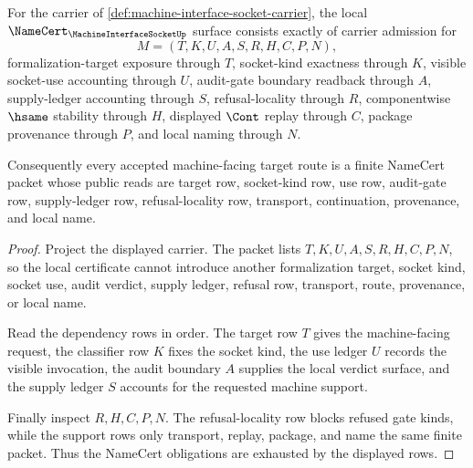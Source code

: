 \begin{theorem}
\label{thm:machine-interface-socket-namecert-obligations}
For the carrier of \autoref{def:machine-interface-socket-carrier}, the local $\NameCert_{\MachineInterfaceSocketUp}$ surface consists exactly of carrier admission for
$$
M=(T,K,U,A,S,R,H,C,P,N),
$$
formalization-target exposure through $T$, socket-kind exactness through $K$, visible socket-use accounting through $U$, audit-gate boundary readback through $A$, supply-ledger accounting through $S$, refusal-locality through $R$, componentwise $\hsame$ stability through $H$, displayed $\Cont$ replay through $C$, package provenance through $P$, and local naming through $N$.

Consequently every accepted machine-facing target route is a finite NameCert packet whose public reads are target row, socket-kind row, use row, audit-gate row, supply-ledger row, refusal-locality row, transport, continuation, provenance, and local name.
\end{theorem}
\begin{proof}
Project the displayed carrier. The packet lists $T,K,U,A,S,R,H,C,P,N$, so the local certificate cannot introduce another formalization target, socket kind, socket use, audit verdict, supply ledger, refusal row, transport, route, provenance, or local name.

Read the dependency rows in order. The target row $T$ gives the machine-facing request, the classifier row $K$ fixes the socket kind, the use ledger $U$ records the visible invocation, the audit boundary $A$ supplies the local verdict surface, and the supply ledger $S$ accounts for the requested machine support.

Finally inspect $R,H,C,P,N$. The refusal-locality row blocks refused gate kinds, while the support rows only transport, replay, package, and name the same finite packet. Thus the NameCert obligations are exhausted by the displayed rows.
\end{proof}

